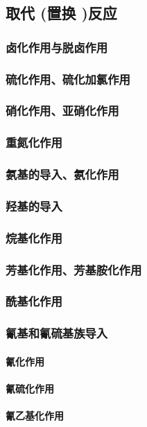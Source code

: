 \documentclass[UTF8]{../03-Chemistry}
\begin{document}
    \subsection{取代 (置换 )反应}
        \subsubsection{卤化作用与脱卤作用}
        \subsubsection{硫化作用、硫化加氯作用}
        \subsubsection{硝化作用、亚硝化作用}
        \subsubsection{重氮化作用}
        \subsubsection{氨基的导入、氨化作用}
        \subsubsection{羟基的导入}
        \subsubsection{烷基化作用}
        \subsubsection{芳基化作用、芳基胺化作用}
        \subsubsection{酰基化作用}
        \subsubsection{氰基和氰硫基族导入}
            \paragraph{氰化作用}
            \paragraph{氰硫化作用}
            \paragraph{氰乙基化作用}
\end{document}
